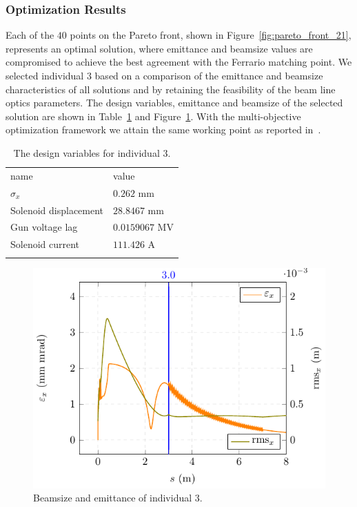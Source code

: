 \subsubsection{Optimization Results}

Each of the $40$ points on the Pareto front, shown in
  Figure~\ref{fig:pareto_front_21}, represents an optimal solution, where
  emittance and beamsize values are compromised to achieve the best agreement
  with the Ferrario matching point.
We selected individual $3$ based on a comparison of the emittance and beamsize
  characteristics of all solutions and by retaining the feasibility of the
  beam line optics parameters.
The design variables, emittance and beamsize of the selected solution are
  shown in Table~\ref{tbl:des_vars} and Figure~\ref{fig:rmsemit}.
With the multi-objective optimization framework we attain the same working
  point as reported in~\cite{pedr:10}.

\begin{table}
  \begin{center}
    \caption{The design variables for individual $3$.}
    \label{tbl:des_vars}
    \begin{tabular}{ll}
      \hline\noalign{\smallskip}
      name & value \\
      \noalign{\smallskip}\hline\noalign{\smallskip}
        $\sigma_{x}$          & $0.262$ mm \\
        Solenoid displacement & $28.8467$ mm \\
        Gun voltage lag       & $0.0159067$ MV\\
        Solenoid current      & $111.426$ A \\
      \noalign{\smallskip}\hline
    \end{tabular}
  \end{center}
\end{table}

\begin{figure}%
  \centering
  \includegraphics[width=0.8\linewidth]{Report/iff_plot_emrms}
  \caption{Beamsize and emittance of individual $3$.}
  \label{fig:rmsemit}
\end{figure}

